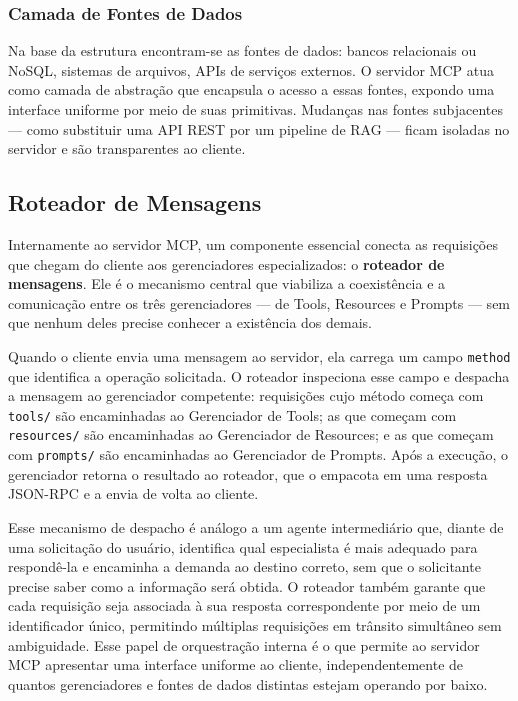 \documentclass[12pt]{article}
\begin{document}
\subsubsection{Camada de Fontes de Dados}

Na base da estrutura encontram-se as fontes de dados: bancos relacionais
ou NoSQL, sistemas de arquivos, APIs de serviços externos. O servidor MCP
atua como camada de abstração que encapsula o acesso a essas fontes,
expondo uma interface uniforme por meio de suas primitivas. Mudanças nas
fontes subjacentes --- como substituir uma API REST por um pipeline de
RAG --- ficam isoladas no servidor e são transparentes ao cliente.

\subsection{Roteador de Mensagens}
\label{subsec:roteador}

Internamente ao servidor MCP, um componente essencial conecta as
requisições que chegam do cliente aos gerenciadores especializados:
o \textbf{roteador de mensagens}. Ele é o mecanismo central que
viabiliza a coexistência e a comunicação entre os três gerenciadores ---
de Tools, Resources e Prompts --- sem que nenhum deles precise conhecer a
existência dos demais.

Quando o cliente envia uma mensagem ao servidor, ela carrega um campo
\texttt{method} que identifica a operação solicitada. O roteador inspeciona
esse campo e despacha a mensagem ao gerenciador competente:
requisições cujo método começa com \texttt{tools/} são encaminhadas ao
Gerenciador de Tools; as que começam com \texttt{resources/} são
encaminhadas ao Gerenciador de Resources; e as que começam com
\texttt{prompts/} são encaminhadas ao Gerenciador de Prompts. Após a
execução, o gerenciador retorna o resultado ao roteador, que o empacota
em uma resposta JSON-RPC e a envia de volta ao cliente.

Esse mecanismo de despacho é análogo a um agente intermediário que, diante
de uma solicitação do usuário, identifica qual especialista é mais adequado
para respondê-la e encaminha a demanda ao destino correto, sem que o
solicitante precise saber como a informação será obtida. O roteador
também garante que cada requisição seja associada à sua resposta
correspondente por meio de um identificador único, permitindo múltiplas
requisições em trânsito simultâneo sem ambiguidade. Esse papel de
orquestração interna é o que permite ao servidor MCP apresentar uma
interface uniforme ao cliente, independentemente de quantos gerenciadores
e fontes de dados distintas estejam operando por baixo.
\end{document}
